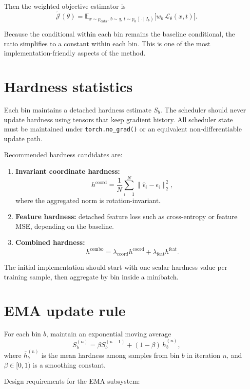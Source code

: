 \documentclass[11pt]{report}
\newcommand{\E}{\mathbb{E}}
\newcommand{\pbase}{p_0}
\newcommand{\loss}{\mathcal{L}}
\newcommand{\obj}{\mathcal{J}}
\begin{document}
Then the weighted objective estimator is
\[
\tilde{\obj}(\theta) = \E_{x \sim p_{\text{data}},\, b \sim q,\, t \sim \pbase(\cdot \mid I_b)}\big[w_b\,\loss_\theta(x,t)\big].
\]

Because the conditional within each bin remains the baseline conditional, the ratio simplifies to a constant within each bin. This is one of the most implementation-friendly aspects of the method.

\section{Hardness statistics}

Each bin maintains a detached hardness estimate $S_b$. The scheduler should never update hardness using tensors that keep gradient history. All scheduler state must be maintained under \texttt{torch.no\_grad()} or an equivalent non-differentiable update path.

Recommended hardness candidates are:

\begin{enumerate}[leftmargin=2em]
    \item \textbf{Invariant coordinate hardness:}
    \[
    h^{\text{coord}} = \frac{1}{N}\sum_{i=1}^N \lVert \hat{\epsilon}_i - \epsilon_i \rVert_2^2,
    \]
    where the aggregated norm is rotation-invariant.
    \item \textbf{Feature hardness:} detached feature loss such as cross-entropy or feature MSE, depending on the baseline.
    \item \textbf{Combined hardness:}
    \[
    h^{\text{combo}} = \lambda_{\text{coord}} h^{\text{coord}} + \lambda_{\text{feat}} h^{\text{feat}}.
    \]
\end{enumerate}

The initial implementation should start with one scalar hardness value per training sample, then aggregate by bin inside a minibatch.

\section{EMA update rule}

For each bin $b$, maintain an exponential moving average
\[
S_b^{(n)} = \beta S_b^{(n-1)} + (1-\beta)\,\bar{h}_b^{(n)},
\]
where $\bar{h}_b^{(n)}$ is the mean hardness among samples from bin $b$ in iteration $n$, and $\beta \in [0,1)$ is a smoothing constant.

Design requirements for the EMA subsystem:
\end{document}
